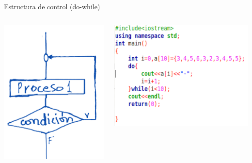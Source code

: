 \documentclass[presentation, aspectratio=54]{beamer}
\begin{document}
\begin{frame}[label={sec:org5daadb0}]{Estructura de control (do-while)}
\begin{columns}
\begin{column}{0.4\columnwidth}
\begin{center}
\includegraphics[width=.9\linewidth]{./images/codigo/dowhile.png}
\end{center}
\end{column}
\begin{column}{0.6\columnwidth}
\begin{center}
\includegraphics[width=.9\linewidth]{./images/codigo/code-dowhile.png}
\end{center}
\end{column}
\end{columns}
\end{frame}
\end{document}
